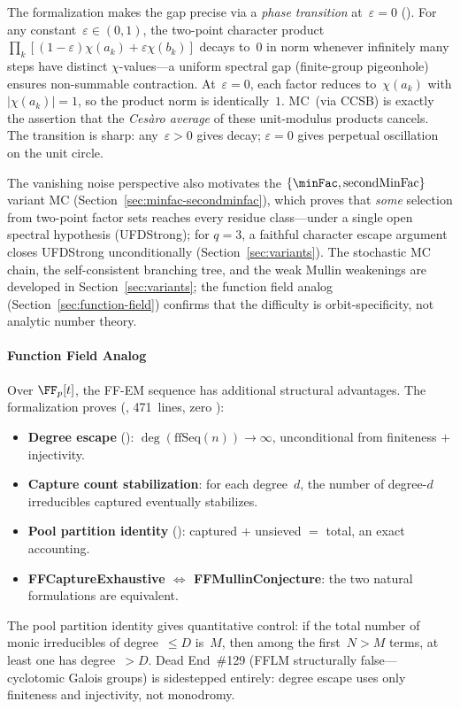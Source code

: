 The formalization makes the gap precise via a \emph{phase transition}
at~$\varepsilon = 0$
().
For any constant~$\varepsilon \in (0,1)$, the two-point character
product $\prod_k[(1{-}\varepsilon)\chi(a_k) + \varepsilon\chi(b_k)]$
decays to~$0$ in norm whenever infinitely many steps have distinct
$\chi$-values---a uniform spectral gap (finite-group pigeonhole)
ensures non-summable contraction.  At~$\varepsilon = 0$, each factor
reduces to~$\chi(a_k)$ with $|\chi(a_k)| = 1$, so the product norm is
identically~$1$.  MC~(via CCSB) is exactly the assertion that the
\emph{Cesàro average} of these unit-modulus products cancels.
The transition is sharp: any~$\varepsilon > 0$ gives decay; $\varepsilon = 0$
gives perpetual oscillation on the unit circle.

The vanishing noise perspective also motivates the
$\{\minFac, \operatorname{secondMinFac}\}$ variant MC
(Section~\ref{sec:minfac-secondminfac}), which proves that
\emph{some} selection from two-point factor sets reaches every
residue class---under a single open spectral hypothesis
(UFDStrong); for $q = 3$, a faithful character escape argument
closes UFDStrong unconditionally (Section~\ref{sec:variants}).
The stochastic MC chain, the self-consistent branching tree,
and the weak Mullin weakenings are developed in
Section~\ref{sec:variants}; the function field analog
(Section~\ref{sec:function-field}) confirms that the difficulty is
orbit-specificity, not analytic number theory.

\paragraph{Function Field Analog}

Over $\FF_p[t]$, the FF-EM sequence has additional structural
advantages.  The formalization proves
(, 471~lines, zero ):
\begin{itemize}[nosep]
\item \textbf{Degree escape}
():
$\deg(\mathrm{ffSeq}(n)) \to \infty$, unconditional from finiteness
$+$ injectivity.
\item \textbf{Capture count stabilization}: for each degree~$d$, the
number of degree-$d$ irreducibles captured eventually stabilizes.
\item \textbf{Pool partition identity}
():
captured $+$ unsieved $=$ total, an exact accounting.
\item \textbf{FFCaptureExhaustive $\Leftrightarrow$ FFMullinConjecture}:
the two natural formulations are equivalent.
\end{itemize}
The pool partition identity gives quantitative control:
if the total number of monic irreducibles of degree~$\leq D$ is~$M$,
then among the first~$N > M$ terms, at least one has degree~$> D$.
Dead End~\#129 (FFLM structurally false---cyclotomic Galois groups)
is sidestepped entirely: degree escape uses only finiteness and
injectivity, not monodromy.

